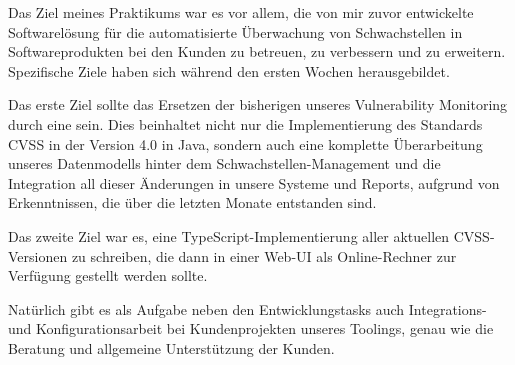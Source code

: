 Das Ziel meines Praktikums war es vor allem, die von mir zuvor entwickelte Softwarelösung für die automatisierte Überwachung von Schwachstellen in Softwareprodukten bei den Kunden zu betreuen, zu verbessern und zu erweitern.
Spezifische Ziele haben sich während den ersten Wochen herausgebildet.

Das erste Ziel sollte das Ersetzen der bisherigen  unseres Vulnerability Monitoring durch eine  sein.
Dies beinhaltet nicht nur die Implementierung des Standards CVSS in der Version 4.0 in Java, sondern auch eine komplette Überarbeitung unseres Datenmodells hinter dem Schwachstellen-Management und die Integration all dieser Änderungen in unsere Systeme und Reports, aufgrund von Erkenntnissen, die über die letzten Monate entstanden sind.

Das zweite Ziel war es, eine TypeScript-Implementierung aller aktuellen CVSS-Versionen zu schreiben, die dann in einer Web-UI als Online-Rechner zur Verfügung gestellt werden sollte.

Natürlich gibt es als Aufgabe neben den Entwicklungstasks auch Integrations- und Konfigurationsarbeit bei Kundenprojekten unseres Toolings, genau wie die Beratung und allgemeine Unterstützung der Kunden.
